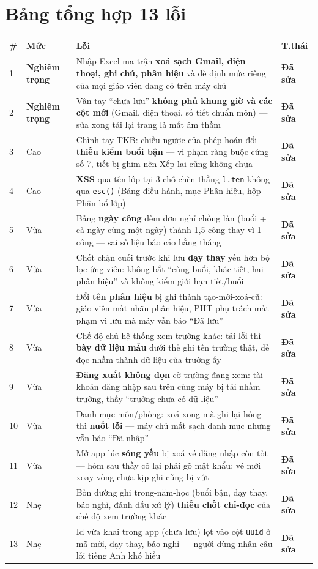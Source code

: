 \documentclass[12pt,a4paper]{article}
\newcommand{\muc}[1]{\textbf{#1}}
\newcommand{\nghiemtrong}{\textcolor{do}{\textbf{Nghiêm trọng}}}
\newcommand{\cao}{\textcolor{do}{Cao}}
\newcommand{\vua}{Vừa}
\newcommand{\nhe}{Nhẹ}
\newcommand{\dasua}{\textcolor{xanh}{\textbf{Đã sửa}}}
\begin{document}
\section{Bảng tổng hợp 13 lỗi}
\begin{longtable}{@{}p{0.6cm}p{1.9cm}p{9.3cm}p{1.6cm}@{}}
\toprule
\muc{\#} & \muc{Mức} & \muc{Lỗi} & \muc{T.thái}\\
\midrule
1 & \nghiemtrong & Nhập Excel ma trận \textbf{xoá sạch Gmail, điện thoại, ghi chú,
    phân hiệu} và đè định mức riêng của mọi giáo viên đang có trên máy chủ & \dasua\\
2 & \nghiemtrong & Vân tay ``chưa lưu'' \textbf{không phủ khung giờ và các cột mới}
    (Gmail, điện thoại, số tiết chuẩn môn) --- sửa xong tải lại trang là mất âm thầm & \dasua\\
3 & \cao & Chỉnh tay TKB: chiều ngược của phép hoán đổi \textbf{thiếu kiểm buổi bận}
    --- vi phạm ràng buộc cứng số 7, tiết bị ghim nên Xếp lại cũng không chữa & \dasua\\
4 & \cao & \textbf{XSS} qua tên lớp tại 3 chỗ chèn thẳng \texttt{l.ten} không qua
    \texttt{esc()} (Bảng điều hành, mục Phân hiệu, hộp Phân bổ lớp) & \dasua\\
5 & \vua & Bảng \textbf{ngày công} đếm đơn nghỉ chồng lấn (buổi + cả ngày cùng
    một ngày) thành 1,5 công thay vì 1 công --- sai số liệu báo cáo hằng tháng & \dasua\\
6 & \vua & Chốt chặn cuối trước khi lưu \textbf{dạy thay} yếu hơn bộ lọc ứng viên:
    không bắt ``cùng buổi, khác tiết, hai phân hiệu'' và không kiểm giới hạn tiết/buổi & \dasua\\
7 & \vua & Đổi \textbf{tên phân hiệu} bị ghi thành tạo-mới-xoá-cũ: giáo viên mất
    nhãn phân hiệu, PHT phụ trách mất phạm vi lưu mà máy vẫn báo ``Đã lưu'' & \dasua\\
8 & \vua & Chế độ chủ hệ thống xem trường khác: tải lỗi thì \textbf{bày dữ liệu mẫu}
    dưới thẻ ghi tên trường thật, dễ đọc nhầm thành dữ liệu của trường ấy & \dasua\\
9 & \vua & \textbf{Đăng xuất không dọn} cờ trường-đang-xem: tài khoản đăng nhập sau
    trên cùng máy bị tải nhầm trường, thấy ``trường chưa có dữ liệu'' & \dasua\\
10 & \vua & Danh mục môn/phòng: xoá xong mà ghi lại hỏng thì \textbf{nuốt lỗi} ---
    máy chủ mất sạch danh mục nhưng vẫn báo ``Đã nhập'' & \dasua\\
11 & \vua & Mở app lúc \textbf{sóng yếu} bị xoá vé đăng nhập còn tốt --- hôm sau
    thầy cô lại phải gõ mật khẩu; vé mới xoay vòng chưa kịp ghi cũng bị vứt & \dasua\\
12 & \nhe & Bốn đường ghi trong-năm-học (buổi bận, dạy thay, báo nghỉ, đánh dấu
    xử lý) \textbf{thiếu chốt chỉ-đọc} của chế độ xem trường khác & \dasua\\
13 & \nhe & Id vừa khai trong app (chưa lưu) lọt vào cột \texttt{uuid} ở mã mời,
    dạy thay, báo nghỉ --- người dùng nhận câu lỗi tiếng Anh khó hiểu & \dasua\\
\bottomrule
\end{longtable}
\end{document}

